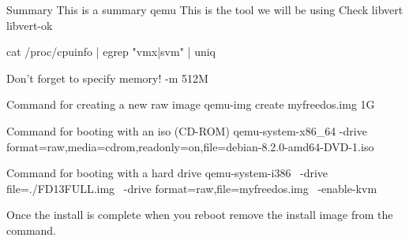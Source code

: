 Summary
This is a summary
qemu
This is the tool we will be using
Check libvert
libvert-ok

cat /proc/cpuinfo | egrep "vmx|svm" | uniq

Don’t forget to specify memory!
-m 512M

Command for creating a new raw image
qemu-img create myfreedos.img 1G

Command for booting with an iso (CD-ROM)
qemu-system-x86_64 -drive format=raw,media=cdrom,readonly=on,file=debian-8.2.0-amd64-DVD-1.iso 

Command for booting with a hard drive
qemu-system-i386 \
	-drive file=./FD13FULL.img \
	-drive format=raw,file=myfreedos.img \
	-enable-kvm


Once the install is complete when you reboot remove the install image from the command.


